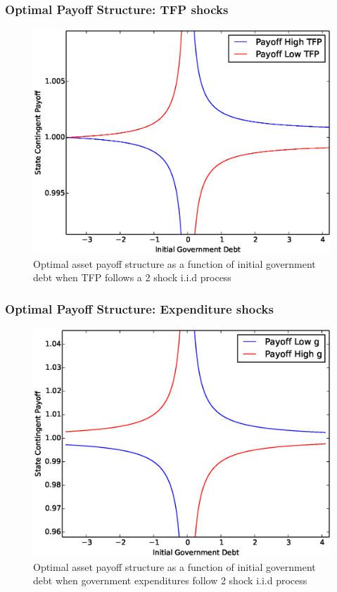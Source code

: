 \documentclass{beamer}
\begin{document}
  \begin{frame}
   \frametitle{Optimal Payoff Structure: TFP shocks}
	\begin{figure}
		\begin{center}
		\includegraphics[scale=.4]{Images/p_graph_tfp.eps}
		\caption{Optimal asset payoff structure as a function of initial government debt when TFP follows a 2 shock i.i.d process}
	\end{center}	
	\end{figure}

  \end{frame}

%
  \begin{frame}
   \frametitle{Optimal Payoff Structure: Expenditure shocks}
	\begin{figure}
		\begin{center}
		\includegraphics[scale=.4]{Images/p_graph.eps}
		\caption{Optimal asset payoff structure as a function of initial government debt when government expenditures follow 2 shock i.i.d process}
	\end{center}	
	\end{figure}

  \end{frame}
%
%
\end{document}
